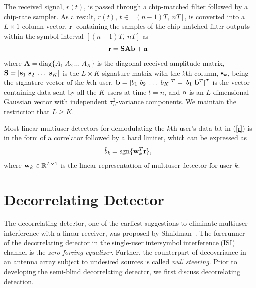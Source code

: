 \documentclass[10pt,fleqn,twocolumn]{IEEEtran}
\newcommand{\br}{{\mathbf r}}
\newcommand{\bA}{{\mathbf A}}
\newcommand{\bb}{{\bf b}}
\newcommand{\bs}{{\bf s}}
\newcommand{\bn}{{\bf n}}
\newcommand{\bw}{{\bf w}}
\newcommand{\bS}{{\bf S}}
\begin{document}
The received signal, $r(t)$, is passed through a chip-matched filter
followed by a chip-rate sampler.  As a result, $r(t)$, $t\in
[(n-1)T,\ nT]$, is converted into a $L\times 1$ column vector,
$\br$, containing the samples of the chip-matched filter outputs within
the symbol interval $[(n-1)T,\ nT]$ as
\begin{equation}
\br = \bS \bA \bb + \bn
\label{r}
\end{equation}
where $\bA=\mbox{diag}\{A_1\ A_2\ \ldots\ A_K\}$ is the diagonal
received amplitude matrix, $\bS = [\bs_1\ \bs_2\ \ldots\
\bs_K]$ is the $L \times K$ signature matrix with the $k$th column,
$\bs_k$, being the signature vector of the $k$th user, $\bb = [b_1\
b_2\ \ldots\ b_K]^T = [b_1\ \tilde{\bb}^T]^T$ is the vector containing data
sent by all the $K$ users at time $t=n$, and $\bn$ is an
$L$-dimensional Gaussian vector with independent $\sigma_n^2$-variance
components. We maintain the restriction that $L \geq K$.

Most linear multiuser detectors for demodulating the $k$th user's data
bit in (\ref{r}) is in the form of a correlator followed by a hard limiter,
which can be expressed as
\begin{equation}
\hat{b}_k = \mbox{sgn}\{\bw_k^T\br\},
\label{linear}
\end{equation}
where $\bw_k \in \mathbb{R}^{L\times 1}$ is the linear representation of
multiuser detector for user $k$.

\section{Decorrelating Detector}

The decorrelating detector, one of the earliest suggestions to eliminate
multiuser interference with a linear receiver, was proposed by
Shnidman~\cite{Shni67}.
The forerunner of the decorrelating detector in the single-user
intersymbol interference (ISI) channel is the {\em zero-forcing equalizer}.
Further, the counterpart of decovariance in an antenna array subject to
undesired sources is called {\em null steering}.   Prior to developing the
semi-blind decorrelating detector, we first discuss decorrelating detection.
\end{document}
